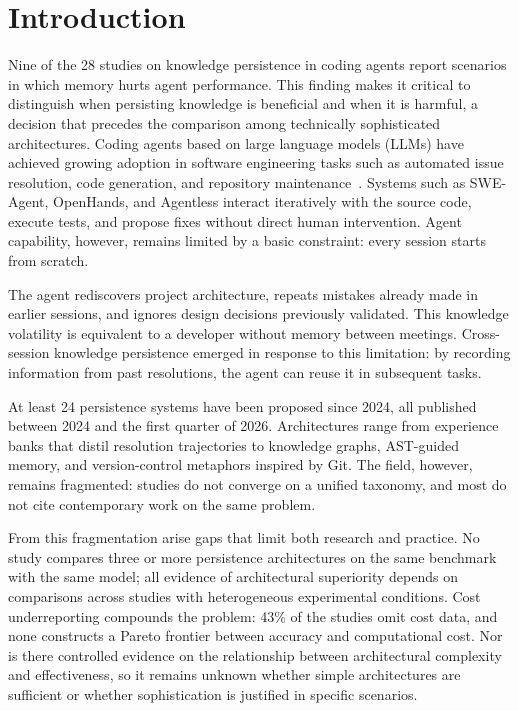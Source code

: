 \section{Introduction}
\label{sec:introducao}


Nine of the 28 studies on knowledge persistence in coding agents report
scenarios in which memory hurts agent performance.
This finding makes it critical to distinguish when persisting knowledge
is beneficial and when it is harmful, a decision that precedes the
comparison among technically sophisticated architectures.
Coding agents based on large language models (LLMs) have achieved
growing adoption in software engineering tasks such as automated issue
resolution, code generation, and repository
maintenance~\citep{du2026memory}.
Systems such as SWE-Agent, OpenHands, and Agentless interact
iteratively with the source code, execute tests, and propose fixes
without direct human intervention.
Agent capability, however, remains limited by a basic constraint:
every session starts from scratch.

The agent rediscovers project architecture, repeats mistakes already
made in earlier sessions, and ignores design decisions previously
validated.
This knowledge volatility is equivalent to a developer without memory
between meetings.
Cross-session knowledge persistence emerged in response to this
limitation: by recording information from past resolutions, the agent
can reuse it in subsequent tasks.

At least 24 persistence systems have been proposed since 2024, all
published between 2024 and the first quarter of 2026.
Architectures range from experience banks that distil resolution
trajectories to knowledge graphs, AST-guided memory, and version-control
metaphors inspired by Git.
The field, however, remains fragmented: studies do not converge on a
unified taxonomy, and most do not cite contemporary work on the same
problem.

From this fragmentation arise gaps that limit both research and
practice.
No study compares three or more persistence architectures on the same
benchmark with the same model; all evidence of architectural
superiority depends on comparisons across studies with heterogeneous
experimental conditions.
Cost underreporting compounds the problem: 43\% of the studies omit
cost data, and none constructs a Pareto frontier between accuracy and
computational cost.
Nor is there controlled evidence on the relationship between
architectural complexity and effectiveness, so it remains unknown
whether simple architectures are sufficient or whether sophistication
is justified in specific scenarios.

